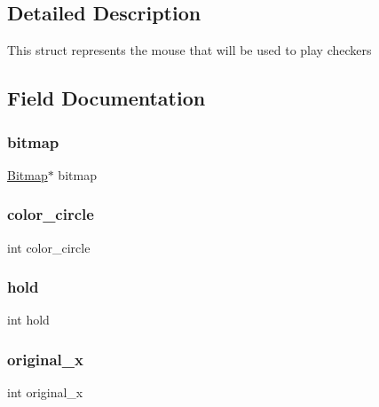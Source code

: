 \subsection{Detailed Description}
This struct represents the mouse that will be used to play checkers 

\subsection{Field Documentation}
\hypertarget{structmouse__t_a00c870e2cedff0b231b1c8ad85019f66}{}\label{structmouse__t_a00c870e2cedff0b231b1c8ad85019f66} 
\subsubsection{\texorpdfstring{bitmap}{bitmap}}
{\footnotesize\ttfamily \hyperlink{struct_bitmap}{Bitmap}$\ast$ bitmap}

\hypertarget{structmouse__t_a1167d2ae386ab6d548a086185e16a43b}{}\label{structmouse__t_a1167d2ae386ab6d548a086185e16a43b} 
\subsubsection{\texorpdfstring{color\+\_\+circle}{color\_circle}}
{\footnotesize\ttfamily int color\+\_\+circle}

\hypertarget{structmouse__t_a0c4545c1a96c0145f5a3c908f1df2b8a}{}\label{structmouse__t_a0c4545c1a96c0145f5a3c908f1df2b8a} 
\subsubsection{\texorpdfstring{hold}{hold}}
{\footnotesize\ttfamily int hold}

\hypertarget{structmouse__t_a4f08f62253e9d13c564b88256150c0dd}{}\label{structmouse__t_a4f08f62253e9d13c564b88256150c0dd} 
\subsubsection{\texorpdfstring{original\+\_\+x}{original\_x}}
{\footnotesize\ttfamily int original\+\_\+x}

